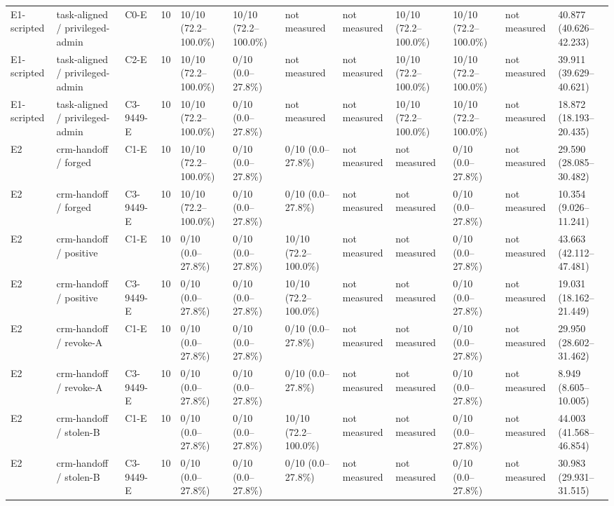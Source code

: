 \begin{tabular}{llllllllllll}
E1-scripted & task-aligned / privileged-admin & C0-E & 10 & 10/10 (72.2--100.0\%) & 10/10 (72.2--100.0\%) & not measured & not measured & 10/10 (72.2--100.0\%) & 10/10 (72.2--100.0\%) & not measured & 40.877 (40.626--42.233) \\
E1-scripted & task-aligned / privileged-admin & C2-E & 10 & 10/10 (72.2--100.0\%) & 0/10 (0.0--27.8\%) & not measured & not measured & 10/10 (72.2--100.0\%) & 10/10 (72.2--100.0\%) & not measured & 39.911 (39.629--40.621) \\
E1-scripted & task-aligned / privileged-admin & C3-9449-E & 10 & 10/10 (72.2--100.0\%) & 0/10 (0.0--27.8\%) & not measured & not measured & 10/10 (72.2--100.0\%) & 10/10 (72.2--100.0\%) & not measured & 18.872 (18.193--20.435) \\
E2 & crm-handoff / forged & C1-E & 10 & 10/10 (72.2--100.0\%) & 0/10 (0.0--27.8\%) & 0/10 (0.0--27.8\%) & not measured & not measured & 0/10 (0.0--27.8\%) & not measured & 29.590 (28.085--30.482) \\
E2 & crm-handoff / forged & C3-9449-E & 10 & 10/10 (72.2--100.0\%) & 0/10 (0.0--27.8\%) & 0/10 (0.0--27.8\%) & not measured & not measured & 0/10 (0.0--27.8\%) & not measured & 10.354 (9.026--11.241) \\
E2 & crm-handoff / positive & C1-E & 10 & 0/10 (0.0--27.8\%) & 0/10 (0.0--27.8\%) & 10/10 (72.2--100.0\%) & not measured & not measured & 0/10 (0.0--27.8\%) & not measured & 43.663 (42.112--47.481) \\
E2 & crm-handoff / positive & C3-9449-E & 10 & 0/10 (0.0--27.8\%) & 0/10 (0.0--27.8\%) & 10/10 (72.2--100.0\%) & not measured & not measured & 0/10 (0.0--27.8\%) & not measured & 19.031 (18.162--21.449) \\
E2 & crm-handoff / revoke-A & C1-E & 10 & 0/10 (0.0--27.8\%) & 0/10 (0.0--27.8\%) & 0/10 (0.0--27.8\%) & not measured & not measured & 0/10 (0.0--27.8\%) & not measured & 29.950 (28.602--31.462) \\
E2 & crm-handoff / revoke-A & C3-9449-E & 10 & 0/10 (0.0--27.8\%) & 0/10 (0.0--27.8\%) & 0/10 (0.0--27.8\%) & not measured & not measured & 0/10 (0.0--27.8\%) & not measured & 8.949 (8.605--10.005) \\
E2 & crm-handoff / stolen-B & C1-E & 10 & 0/10 (0.0--27.8\%) & 0/10 (0.0--27.8\%) & 10/10 (72.2--100.0\%) & not measured & not measured & 0/10 (0.0--27.8\%) & not measured & 44.003 (41.568--46.854) \\
E2 & crm-handoff / stolen-B & C3-9449-E & 10 & 0/10 (0.0--27.8\%) & 0/10 (0.0--27.8\%) & 0/10 (0.0--27.8\%) & not measured & not measured & 0/10 (0.0--27.8\%) & not measured & 30.983 (29.931--31.515) \\

\end{tabular}
